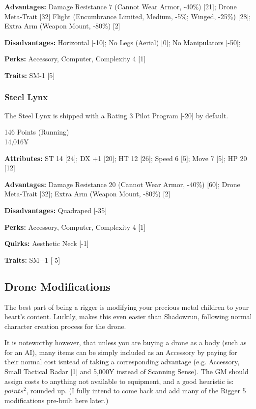 \begin{multicols*}{2}
	\textbf{Advantages:} 
	Damage Resistance 7 (Cannot Wear Armor, -40\%) [21]; Drone Meta-Trait [32] Flight (Encumbrance Limited, Medium, -5\%; Winged, -25\%) [28]; Extra Arm (Weapon Mount, -80\%) [2]
	
	\textbf{Disadvantages:} 
	Horizontal [-10]; No Legs (Aerial) [0]; No Manipulators [-50]; 
	
	\textbf{Perks:}
	Accessory, Computer, Complexity 4 [1]
	
	\textbf{Traits:}
	SM-1 [5]
	
	\subsubsection{Steel Lynx}
	
	The Steel Lynx is shipped with a Rating 3 Pilot Program [-20] by default.
	
	\begin{flushright}
		146 Points (Running)\\
		14,016¥
	\end{flushright}
	
	\textbf{Attributes:} 
	ST 14 [24]; DX +1 [20]; HT 12 [26]; 
	Speed 6 [5]; Move 7 [5]; HP 20 [12]
	
	\textbf{Advantages:} 
	Damage Resistance 20 (Cannot Wear Armor, -40\%) [60]; Drone Meta-Trait [32]; Extra Arm (Weapon Mount, -80\%) [2]
	
	\textbf{Disadvantages:} 
	Quadraped [-35]
	
	\textbf{Perks:}
	Accessory, Computer, Complexity 4 [1]
	
	\textbf{Quirks:}
	Aesthetic Neck [-1]
	
	\textbf{Traits:}
	SM+1 [-5]
	
	\subsection{Drone Modifications}
	
	The best part of being a rigger is modifying your precious metal children to your heart's content. Luckily, \GURPS makes this even easier than Shadowrun, following normal character creation process for the drone. 
	
	It is noteworthy however, that unless you are buying a drone as a body (such as for an AI), many items can be simply included as an Accessory by paying for their normal cost isntead of taking a corresponding advantage (e.g. Accessory, Small Tactical Radar [1] and 5,000¥ instead of Scanning Sense). The GM should assign costs to anything not available to equipment, and a good heuristic is: $points^{2}$, rounded up. (I fully intend to come back and add many of the Rigger 5 modifications pre-built here later.)
	
\end{multicols*}

